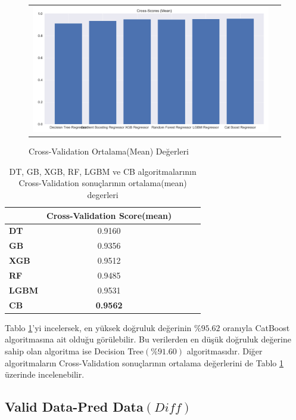 \documentclass[conference]{IEEEtran}
\begin{document}
\begin{figure}[!h]
	\centering
	\begin{center}
		\begin{tabular}{cc}
			\includegraphics[scale=0.2]{pictures/pic_16.png}&
		\end{tabular}
	\end{center}
	\caption{Cross-Validation Ortalama(Mean) Değerleri}
	\label{fig:16}
\end{figure}
\pagebreak
\begin{table}[h]
	\centering
	\normalsize
	\begin{tabular}{|l|c|c|c|c|}
		\hline
					& \textbf{Cross-Validation Score(mean)}	\\ \hline
		\textbf{DT}		& 0.9160		\\ \hline
		\textbf{GB}		& 0.9356		\\ \hline
		\textbf{XGB}		& 0.9512		\\ \hline
		\textbf{RF}		& 0.9485		\\ \hline
		\textbf{LGBM}	& 0.9531		\\ \hline
		\textbf{CB}		& \textbf{0.9562}	\\ \hline
	\end{tabular}
	\caption{DT, GB, XGB, RF, LGBM ve CB algoritmalarının Cross-Validation sonuçlarının ortalama(mean) degerleri}
	\label{tbl:02}
\end{table}

\quad Tablo \ref{tbl:02}'yi incelersek, en yüksek doğruluk değerinin $\%95.62$ oranıyla CatBoost algoritmasına ait olduğu görülebilir. Bu verilerden en düşük doğruluk değerine sahip olan algoritma ise Decision Tree$(\%91.60)$ algoritmasıdır. Diğer algoritmaların Cross-Validation sonuçlarının ortalama değerlerini de Tablo \ref{tbl:02} üzerinde incelenebilir.

\subsection{\textbf{Valid Data-Pred Data$(Diff)$}}
\end{document}
